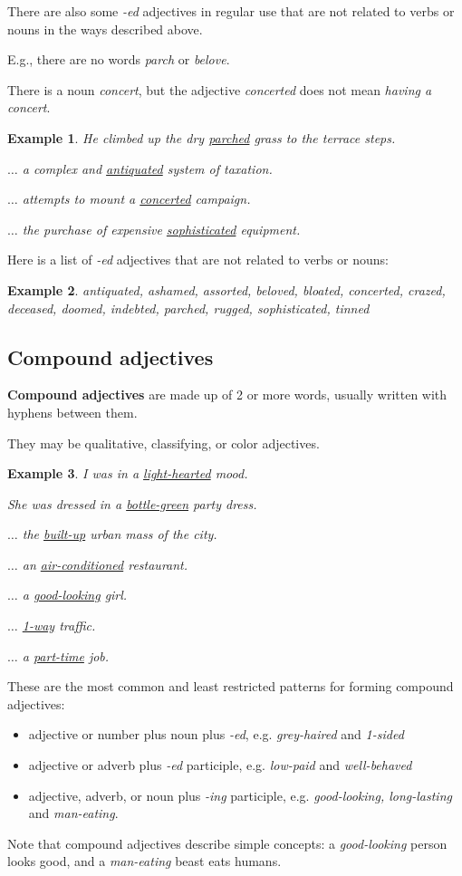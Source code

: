 \documentclass[oneside]{book}
\numberwithin{equation}{section}
\newtheorem{example}{Example}[section]
\begin{document}
%
\noindent{} There are also some \textit{-ed} adjectives in regular use that are not related to verbs or nouns in the ways described above.

E.g., there are no words \textit{parch} or \textit{belove}.

There is a noun \textit{concert}, but the adjective \textit{concerted} does not mean \textit{having a concert}.
\begin{example}
    He climbed up the dry \underline{parched} grass to the terrace steps.
    
    $\ldots$ a complex and \underline{antiquated} system of taxation.
    
    $\ldots$ attempts to mount a \underline{concerted} campaign.
    
    $\ldots$ the purchase of expensive \underline{sophisticated} equipment.
\end{example}
%
\noindent{} Here is a list of \textit{-ed} adjectives that are not related to verbs or nouns:
\begin{example}
    antiquated, ashamed, assorted, beloved, bloated, concerted, crazed, deceased, doomed, indebted, parched, rugged, sophisticated, tinned
\end{example}

\subsection{Compound adjectives}
\noindent{} \textbf{Compound adjectives} are made up of 2 or more words, usually written with hyphens between them.

They may be qualitative, classifying, or color adjectives.
\begin{example}
    I was in a \underline{light-hearted} mood.
    
    She was dressed in a \underline{bottle-green} party dress.
    
    $\ldots$ the \underline{built-up} urban mass of the city.
    
    $\ldots$ an \underline{air-conditioned} restaurant.
    
    $\ldots$ a \underline{good-looking} girl.
    
    $\ldots$ \underline{1-way} traffic.
    
    $\ldots$ a \underline{part-time} job.
\end{example}
%
\noindent{} These are the most common and least restricted patterns for forming compound adjectives:
\begin{itemize}
    \item adjective or number plus noun plus \textit{-ed}, e.g. \textit{grey-haired} and \textit{1-sided}
    \item adjective or adverb plus \textit{-ed} participle, e.g. \textit{low-paid} and \textit{well-behaved}
    \item adjective, adverb, or noun plus \textit{-ing} participle, e.g. \textit{good-looking, long-lasting} and \textit{man-eating}.
\end{itemize}
Note that compound adjectives describe simple concepts: a \textit{good-looking} person looks good, and a \textit{man-eating} beast eats humans.
\end{document}
